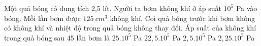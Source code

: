 \begin{vidu}%
	Một quả bóng có dung tích 2,5 lít. Người ta bơm không khí ở áp suất $10^5$ Pa vào bóng. Mỗi lần bơm được $125\ cm^3$ không khí. Coi quả bóng trước khi bơm không có không khí và nhiệt độ trong quả bóng không thay đổi. Áp suất của không khí trong quả bóng sau 45 lần bơm là
	\choice
	{$25. 10^5$ Pa}
	{$22,5 .10^5$ Pa}
	{$2,5. 10^5$ Pa}
	{\True $2,25. 10^5$ Pa}
\end{vidu}
